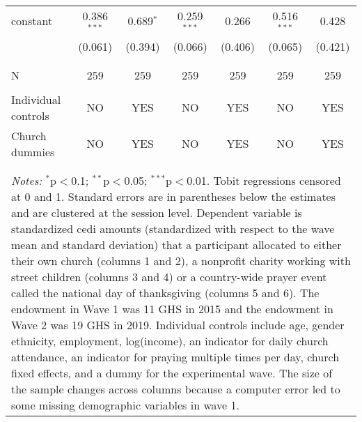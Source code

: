 \begin{table}[!htbp]
\begin{tabular}{@{\extracolsep{5pt}}lcccccc}
 constant & 0.386$^{***}$ & 0.689$^{*}$ & 0.259$^{***}$ & 0.266 & 0.516$^{***}$ & 0.428 \\ 
  & (0.061) & (0.394) & (0.066) & (0.406) & (0.065) & (0.421) \\ 
  & & & & & & \\ 
\cline{2-7} \\[-2.0ex]
N & 259 & 259 & 259 & 259 & 259 & 259 \\  \hline \\[-1.8ex] 
Individual controls & NO & YES & NO & YES & NO & YES \\ 
Church dummies & NO & YES & NO & YES & NO & YES \\ 
\\[-2.0ex]
\hline 
\hline \\[-1.8ex] 
\multicolumn{7}{l}{ \parbox[t]{0.95\linewidth}{\small{ \textit{Notes:} $^{*}$p$<$0.1; $^{**}$p$<$0.05; $^{***}$p$<$0.01}.  Tobit regressions censored at 0 and 1. Standard errors are in parentheses below the estimates and are clustered at the session level. Dependent variable is standardized cedi amounts (standardized with respect to the wave mean and standard deviation) that a participant allocated to either their own church (columns 1 and 2), a nonprofit charity working with street children (columns 3 and 4) or a country-wide prayer event called the national day of thanksgiving (columns 5 and 6). The endowment in Wave 1 was 11 GHS in 2015 and the endowment in Wave 2 was 19 GHS in 2019. Individual controls include age, gender ethnicity, employment, log(income), an indicator for daily church attendance, an indicator for praying multiple times per day, church fixed effects, and a dummy for the experimental wave. The size of the sample changes across columns because a computer error led to some missing demographic variables in wave 1. }}\\
\end{tabular} 
\end{table} 
